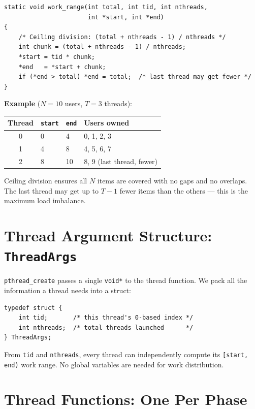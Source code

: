 \documentclass[12pt,a4paper]{article}
\begin{document}
\begin{lstlisting}
static void work_range(int total, int tid, int nthreads,
                       int *start, int *end)
{
    /* Ceiling division: (total + nthreads - 1) / nthreads */
    int chunk = (total + nthreads - 1) / nthreads;
    *start = tid * chunk;
    *end   = *start + chunk;
    if (*end > total) *end = total;  /* last thread may get fewer */
}
\end{lstlisting}

\textbf{Example} ($N = 10$ users, $T = 3$ threads):
\begin{center}
\begin{tabular}{clll}
\toprule
Thread & \texttt{start} & \texttt{end} & Users owned \\
\midrule
0 & 0 & 4 & 0, 1, 2, 3 \\
1 & 4 & 8 & 4, 5, 6, 7 \\
2 & 8 & 10 & 8, 9 (last thread, fewer) \\
\bottomrule
\end{tabular}
\end{center}

Ceiling division ensures all $N$ items are covered with no gaps and no
overlaps.  The last thread may get up to $T-1$ fewer items than the others —
this is the maximum load imbalance.

\section{Thread Argument Structure: \texttt{ThreadArgs}}

\texttt{pthread\_create} passes a single \texttt{void*} to the thread function.
We pack all the information a thread needs into a struct:

\begin{lstlisting}
typedef struct {
    int tid;       /* this thread's 0-based index */
    int nthreads;  /* total threads launched      */
} ThreadArgs;
\end{lstlisting}

From \texttt{tid} and \texttt{nthreads}, every thread can independently
compute its \texttt{[start, end)} work range.  No global variables are needed
for work distribution.

\section{Thread Functions: One Per Phase}
\end{document}
